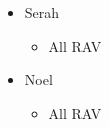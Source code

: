 \begin{menu}
\begin{itemize}
	\crystarium
	\begin{itemize}
		\item Serah
		\begin{itemize}
			\item All RAV
		\end{itemize}
		\item Noel
		\begin{itemize}
			\item All RAV
		 \end{itemize}
	\end{itemize}
\end{itemize}
\end{menu}

\newline
